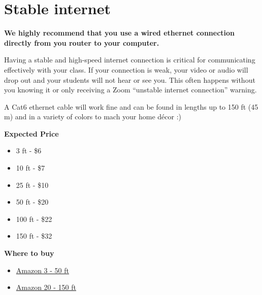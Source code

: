\section{Stable internet}
\label{sec:equipment::internet}
\textbf{We highly recommend that you use a wired ethernet connection directly from you router to your computer.}

Having a stable and high-speed internet connection is critical for communicating effectively with your class. 
If your connection is weak, your video or audio will drop out and your students will not hear or see you.
This often happens without you knowing it or only receiving a Zoom ``unstable internet connection'' warning.
 
A Cat6 ethernet cable will work fine and can be found in lengths up to 150 ft (45 m) and in a variety of colors to mach your home d\'{e}cor :)

\textbf{Expected Price}
\begin{itemize}
	\item 3 ft - \$6
	\item 10 ft - \$7
	\item 25 ft - \$10
	\item 50 ft - \$20
	\item 100 ft - \$22
	\item 150 ft - \$32
\end{itemize}

\textbf{Where to buy}
\begin{itemize}
\item \href{https://www.amazon.com/AmazonBasics-RJ45-Cat-6-Ethernet-Patch-Cable-10-Feet-3-Meters/dp/B0134QJH4G/ref=sr_1_5?dchild=1&keywords=cat6%2Bethernet%2Bcable&qid=1597264670&sr=8-5&th=1}{Amazon 3 - 50 ft}
%
\item \href{https://www.amazon.com/Cable-Matters-Snagless-Ethernet-Black/dp/B007NZGPAY/ref=sr_1_3?dchild=1&keywords=cat6%2Bethernet%2Bcable&qid=1597264670&sr=8-3&th=1}{Amazon 20 - 150 ft}
\end{itemize}


